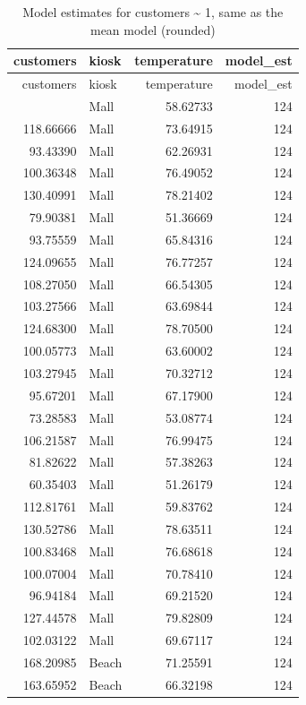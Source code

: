 \documentclass[
  12pt,
  letterpaper,
  DIV=11,
  numbers=noendperiod]{scrreprt}
\begin{document}
\begin{longtable}[]{@{}rlrr@{}}
\caption{Model estimates for customers \textasciitilde{} 1, same as the
mean model
(rounded)}\label{tbl-mean-model-estimates-kiosk-1}\tabularnewline
\toprule\noalign{}
customers & kiosk & temperature & model\_est \\
\midrule\noalign{}
\endfirsthead
\toprule\noalign{}
customers & kiosk & temperature & model\_est \\
\midrule\noalign{}
\endhead
\bottomrule\noalign{}
\endlastfoot
66.78076 & Mall & 58.62733 & 124 \\
118.66666 & Mall & 73.64915 & 124 \\
93.43390 & Mall & 62.26931 & 124 \\
100.36348 & Mall & 76.49052 & 124 \\
130.40991 & Mall & 78.21402 & 124 \\
79.90381 & Mall & 51.36669 & 124 \\
93.75559 & Mall & 65.84316 & 124 \\
124.09655 & Mall & 76.77257 & 124 \\
108.27050 & Mall & 66.54305 & 124 \\
103.27566 & Mall & 63.69844 & 124 \\
124.68300 & Mall & 78.70500 & 124 \\
100.05773 & Mall & 63.60002 & 124 \\
103.27945 & Mall & 70.32712 & 124 \\
95.67201 & Mall & 67.17900 & 124 \\
73.28583 & Mall & 53.08774 & 124 \\
106.21587 & Mall & 76.99475 & 124 \\
81.82622 & Mall & 57.38263 & 124 \\
60.35403 & Mall & 51.26179 & 124 \\
112.81761 & Mall & 59.83762 & 124 \\
130.52786 & Mall & 78.63511 & 124 \\
100.83468 & Mall & 76.68618 & 124 \\
100.07004 & Mall & 70.78410 & 124 \\
96.94184 & Mall & 69.21520 & 124 \\
127.44578 & Mall & 79.82809 & 124 \\
102.03122 & Mall & 69.67117 & 124 \\
168.20985 & Beach & 71.25591 & 124 \\
163.65952 & Beach & 66.32198 & 124 \\

\end{longtable}
\end{document}
